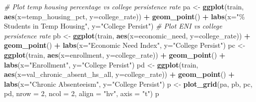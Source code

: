 \documentclass[
  man,floatsintext]{apa6}
\newenvironment{Shaded}{\begin{snugshade}}{\end{snugshade}}
\newcommand{\AttributeTok}[1]{\textcolor[rgb]{0.13,0.29,0.53}{#1}}
\newcommand{\CommentTok}[1]{\textcolor[rgb]{0.56,0.35,0.01}{\textit{#1}}}
\newcommand{\DecValTok}[1]{\textcolor[rgb]{0.00,0.00,0.81}{#1}}
\newcommand{\FunctionTok}[1]{\textcolor[rgb]{0.13,0.29,0.53}{\textbf{#1}}}
\newcommand{\NormalTok}[1]{#1}
\newcommand{\OtherTok}[1]{\textcolor[rgb]{0.56,0.35,0.01}{#1}}
\newcommand{\SpecialCharTok}[1]{\textcolor[rgb]{0.81,0.36,0.00}{\textbf{#1}}}
\newcommand{\StringTok}[1]{\textcolor[rgb]{0.31,0.60,0.02}{#1}}
\begin{document}
\begin{Shaded}
\begin{Highlighting}[]
\CommentTok{\# Plot temp housing percentage vs college persistence rate}
\NormalTok{pa }\OtherTok{\textless{}{-}} \FunctionTok{ggplot}\NormalTok{(train, }\FunctionTok{aes}\NormalTok{(}\AttributeTok{x=}\NormalTok{temp\_housing\_pct, }\AttributeTok{y=}\NormalTok{college\_rate)) }\SpecialCharTok{+}
  \FunctionTok{geom\_point}\NormalTok{() }\SpecialCharTok{+}
  \FunctionTok{labs}\NormalTok{(}\AttributeTok{x=}\StringTok{"\% Students in Temp Housing"}\NormalTok{,}
       \AttributeTok{y=}\StringTok{"College Persist"}\NormalTok{)}
\CommentTok{\# Plot ENI vs college persistence rate}
\NormalTok{pb }\OtherTok{\textless{}{-}} \FunctionTok{ggplot}\NormalTok{(train, }\FunctionTok{aes}\NormalTok{(}\AttributeTok{x=}\NormalTok{economic\_need, }\AttributeTok{y=}\NormalTok{college\_rate)) }\SpecialCharTok{+}
  \FunctionTok{geom\_point}\NormalTok{() }\SpecialCharTok{+}
  \FunctionTok{labs}\NormalTok{(}\AttributeTok{x=}\StringTok{"Economic Need Index"}\NormalTok{,}
       \AttributeTok{y=}\StringTok{"College Persist"}\NormalTok{)}
\NormalTok{pc }\OtherTok{\textless{}{-}} \FunctionTok{ggplot}\NormalTok{(train, }\FunctionTok{aes}\NormalTok{(}\AttributeTok{x=}\NormalTok{enrollment, }\AttributeTok{y=}\NormalTok{college\_rate)) }\SpecialCharTok{+}
  \FunctionTok{geom\_point}\NormalTok{() }\SpecialCharTok{+}
  \FunctionTok{labs}\NormalTok{(}\AttributeTok{x=}\StringTok{"Enrollment"}\NormalTok{,}
       \AttributeTok{y=}\StringTok{"College Persist"}\NormalTok{)}
\NormalTok{pd }\OtherTok{\textless{}{-}} \FunctionTok{ggplot}\NormalTok{(train, }\FunctionTok{aes}\NormalTok{(}\AttributeTok{x=}\NormalTok{val\_chronic\_absent\_hs\_all, }\AttributeTok{y=}\NormalTok{college\_rate)) }\SpecialCharTok{+}
  \FunctionTok{geom\_point}\NormalTok{() }\SpecialCharTok{+}
  \FunctionTok{labs}\NormalTok{(}\AttributeTok{x=}\StringTok{"Chronic Absenteeism"}\NormalTok{,}
       \AttributeTok{y=}\StringTok{"College Persist"}\NormalTok{)}
\NormalTok{p }\OtherTok{\textless{}{-}} \FunctionTok{plot\_grid}\NormalTok{(pa, pb, pc, pd, }\AttributeTok{nrow =} \DecValTok{2}\NormalTok{, }\AttributeTok{ncol =} \DecValTok{2}\NormalTok{, }\AttributeTok{align =} \StringTok{"hv"}\NormalTok{, }\AttributeTok{axis =} \StringTok{"t"}\NormalTok{)}
\NormalTok{p}


\end{Highlighting}
\end{Shaded}
\end{document}
